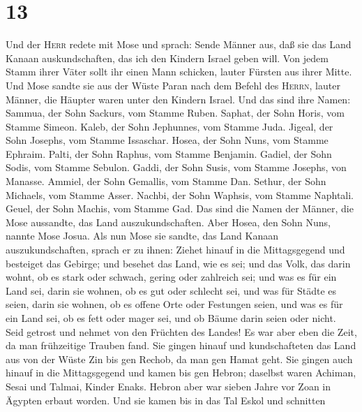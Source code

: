 \hypertarget{section-12}{%
\section{13}\label{section-12}}

 Und der \textsc{Herr} redete mit Mose und sprach:
 Sende Männer aus, daß sie das Land Kanaan
auskundschaften, das ich den Kindern Israel geben will. Von jedem Stamm
ihrer Väter sollt ihr einen Mann schicken, lauter Fürsten aus ihrer
Mitte.  Und Mose sandte sie aus der Wüste Paran nach dem
Befehl des \textsc{Herrn}, lauter Männer, die Häupter waren unter den
Kindern Israel.  Und das sind ihre Namen: Sammua, der Sohn
Sackurs, vom Stamme Ruben.  Saphat, der Sohn Horis, vom
Stamme Simeon.  Kaleb, der Sohn Jephunnes, vom Stamme
Juda.  Jigeal, der Sohn Josephs, vom Stamme Issaschar.
 Hosea, der Sohn Nuns, vom Stamme Ephraim. 
Palti, der Sohn Raphus, vom Stamme Benjamin.  Gadiel, der
Sohn Sodis, vom Stamme Sebulon.  Gaddi, der Sohn Susis,
vom Stamme Josephs, von Manasse.  Ammiel, der Sohn
Gemallis, vom Stamme Dan.  Sethur, der Sohn Michaels, vom
Stamme Asser.  Nachbi, der Sohn Waphsis, vom Stamme
Naphtali.  Geuel, der Sohn Machis, vom Stamme Gad.
 Das sind die Namen der Männer, die Mose aussandte, das
Land auszukundschaften. Aber Hosea, den Sohn Nuns, nannte Mose Josua.
 Als nun Mose sie sandte, das Land Kanaan
auszukundschaften, sprach er zu ihnen: Ziehet hinauf in die
Mittagsgegend und besteiget das Gebirge;  und besehet das
Land, wie es sei; und das Volk, das darin wohnt, ob es stark oder
schwach, gering oder zahlreich sei;  und was es für ein
Land sei, darin sie wohnen, ob es gut oder schlecht sei, und was für
Städte es seien, darin sie wohnen, ob es offene Orte oder Festungen
seien,  und was es für ein Land sei, ob es fett oder
mager sei, und ob Bäume darin seien oder nicht. Seid getrost und nehmet
von den Früchten des Landes! Es war aber eben die Zeit, da man
frühzeitige Trauben fand.  Sie gingen hinauf und
kundschafteten das Land aus von der Wüste Zin bis gen Rechob, da man gen
Hamat geht.  Sie gingen auch hinauf in die Mittagsgegend
und kamen bis gen Hebron; daselbst waren Achiman, Sesai und Talmai,
Kinder Enaks. Hebron aber war sieben Jahre vor Zoan in Ägypten erbaut
worden.  Und sie kamen bis in das Tal Eskol und schnitten
